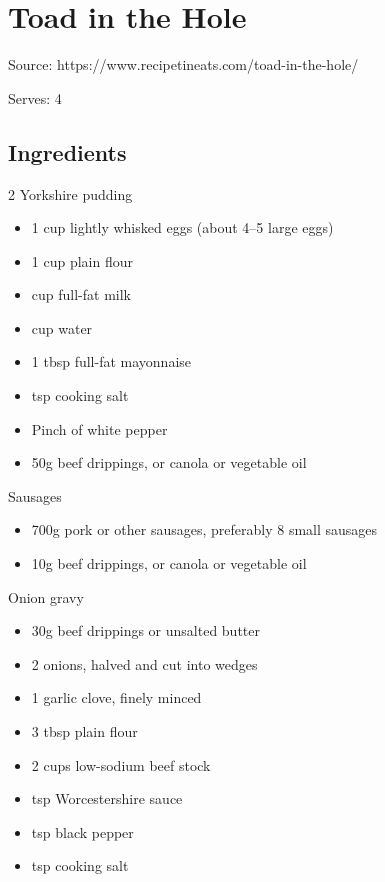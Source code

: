 \clearpage
\section{Toad in the Hole}


Source: https://www.recipetineats.com/toad-in-the-hole/

Serves: 4

\subsection{Ingredients}

\begin{multicols}{2}
    Yorkshire pudding

    \begin{itemize}
        \item 1 cup lightly whisked eggs (about 4--5 large eggs)
        \item 1 cup plain flour
        \item {} cup full-fat milk
        \item {} cup water
        \item 1 tbsp full-fat mayonnaise
        \item {} tsp cooking salt
        \item Pinch of white pepper
        \item 50g beef drippings, or canola or vegetable oil
    \end{itemize}

    Sausages

    \begin{itemize}
        \item 700g pork or other sausages, preferably 8 small sausages
        \item 10g beef drippings, or canola or vegetable oil
    \end{itemize}

    \columnbreak

    Onion gravy

    \begin{itemize}
        \item 30g beef drippings or unsalted butter
        \item 2 onions, halved and cut into wedges
        \item 1 garlic clove, finely minced
        \item 3 tbsp plain flour
        \item 2 cups low-sodium beef stock
        \item {} tsp Worcestershire sauce
        \item {} tsp black pepper
        \item {} tsp cooking salt
    \end{itemize}
\end{multicols}

